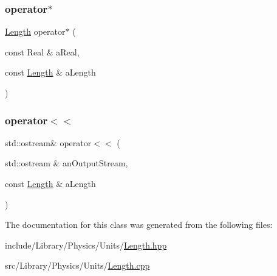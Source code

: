 \subsubsection{\texorpdfstring{operator$\ast$}{operator*}}
{\footnotesize\ttfamily \hyperlink{classlibrary_1_1physics_1_1units_1_1_length}{Length} operator$\ast$ (\begin{DoxyParamCaption}\item[{const Real \&}]{a\+Real,  }\item[{const \hyperlink{classlibrary_1_1physics_1_1units_1_1_length}{Length} \&}]{a\+Length }\end{DoxyParamCaption})\hspace{0.3cm}{\ttfamily [friend]}}

\mbox{\label{classlibrary_1_1physics_1_1units_1_1_length_a95a13170a8d57cb0060eae94520eace4}} 
\subsubsection{\texorpdfstring{operator$<$$<$}{operator<<}}
{\footnotesize\ttfamily std\+::ostream\& operator$<$$<$ (\begin{DoxyParamCaption}\item[{std\+::ostream \&}]{an\+Output\+Stream,  }\item[{const \hyperlink{classlibrary_1_1physics_1_1units_1_1_length}{Length} \&}]{a\+Length }\end{DoxyParamCaption})\hspace{0.3cm}{\ttfamily [friend]}}



The documentation for this class was generated from the following files\+:\begin{DoxyCompactItemize}
\item 
include/\+Library/\+Physics/\+Units/\hyperlink{_length_8hpp}{Length.\+hpp}\item 
src/\+Library/\+Physics/\+Units/\hyperlink{_length_8cpp}{Length.\+cpp}\end{DoxyCompactItemize}

